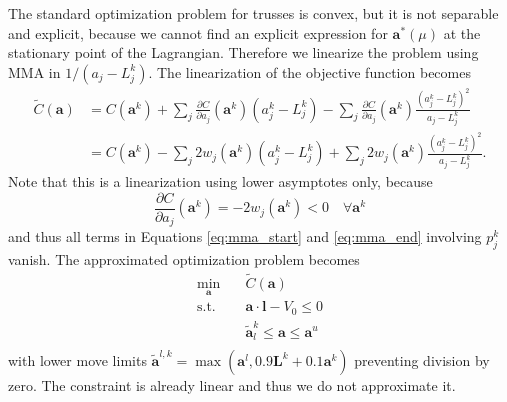 The standard optimization problem for trusses is convex, but it is not separable and explicit, because we cannot find an explicit expression for $\mathbf{a}^*(\mu)$ at the stationary point of the Lagrangian. Therefore we linearize the problem using MMA in $1/(a_j-L_j^k)$. The linearization of the objective function becomes
\begin{align}
    \tilde{C}(\mathbf{a}) &= C(\mathbf{a}^k) + \sum_j \frac{\partial C}{\partial a_j}(\mathbf{a}^k) (a^k_j-L^k_j) - \sum_j \frac{\partial C}{\partial a_j}(\mathbf{a}^k) \frac{(a^k_j-L^k_j)^2}{a_j-L^k_j}\\
    &=C(\mathbf{a}^k) 
    - \sum_j 2w_j (\mathbf{a}^k) (a^k_j-L^k_j)
    + \sum_j 2w_j (\mathbf{a}^k)
    \frac{(a^k_j-L^k_j)^2}{a_j-L^k_j}.
\end{align}
Note that this is a linearization using lower asymptotes only, because 
\begin{equation}
    \frac{\partial C }{\partial a_j}(\mathbf{a}^k)  = - 2 w_j (\mathbf{a}^k) < 0 \quad \forall \mathbf{a}^k
\end{equation} 
and thus all terms in Equations \eqref{eq:mma_start} and \eqref{eq:mma_end} involving $p_j^k$ vanish.
The approximated optimization problem becomes 
\begin{equation}
    \begin{aligned}
        \min_{\mathbf{a}} \quad & \tilde{C} (\mathbf{a})\\
        \textrm{s.t.} \quad & \mathbf{a} \cdot \mathbf{l} - V_0 \le 0  \\
                            & \tilde{\mathbf{a}}^k_l \le \mathbf{a} \le \mathbf{a}^u\\
    \end{aligned}
\end{equation}
with lower move limits $\tilde{\mathbf{a}}^{l,k} = \max(\mathbf{a}^l,  0.9 \mathbf{L}^k + 0.1 \mathbf{a}^k)$ preventing division by zero. The constraint is already linear and thus we do not approximate it.

